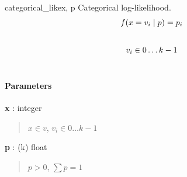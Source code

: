 \hypertarget{pymc.distributions.categorical_like}{}
\begin{funcdesc}{categorical\_like}{x, p}
Categorical log-likelihood.
\begin{gather}
\begin{split}f(x=v_i \mid p) = p_i\end{split}\notag\\\begin{split}\end{split}\notag
\end{gather}\begin{gather}
\begin{split}v_i \in 0 \ldots k-1\end{split}\notag\\\begin{split}\end{split}\notag
\end{gather}
\paragraph{Parameters}
\begin{paramlist}
\item[] \textbf{x} : integer
\begin{quote}
$x \in v$, $v_i \in 0 \ldots k-1$
\end{quote}

\item[]\textbf{p} : (k) float
\begin{quote}
$p > 0$, $\sum p = 1$
\end{quote}
\end{paramlist}
\end{funcdesc}

